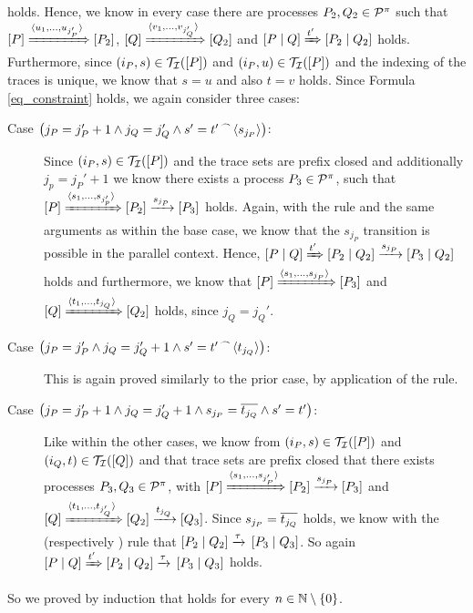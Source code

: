 \begin{prf}
\begin{description}
holds. Hence, we know in every case there are processes $P_2,Q_2\in\mathcal P^{\pi}$ such that $\left[P\right]\xRightarrow{\langle u_1,\ldots,u_{j_P'}\rangle}\left[P_2\right]$, $\left[Q\right]\xRightarrow{\langle v_1,\ldots,v_{j_Q'}\rangle}\left[Q_2\right]$ and $\left[P \mid Q\right]\xRightarrow{t'}\left[P_2 \mid Q_2\right]$ holds. Furthermore, since $\left(i_P,s\right)\in\mathcal{T_I}(\left[P\right])$ and $\left(i_P,u\right)\in\mathcal{T_I}(\left[P\right])$ and the indexing of the traces is unique, we know that $s=u$ and also $t=v$ holds. Since Formula \ref{eq_constraint} holds, we again consider three cases:
\begin{description}
		\item[Case $\left(j_P=j_P'+1\wedge j_Q=j_Q'\wedge s'={t'}^{\,\frown{}\,}{\langle s_{j_P}\rangle}\right)$:] Since $\left(i_P,s\right)\in\mathcal{T_I}(\left[P\right])$ and the trace sets are prefix closed and additionally $j_p=j_P'+1$ we know there exists a process $P_3\in\mathcal P^{\pi}$, such that $\left[P\right]\xRightarrow{\langle s_1,\ldots,s_{j_p'}\rangle}\left[P_2\right]\xrightarrow{s_{j_P}}\left[P_3\right]$ holds. Again, with the \eparl{} rule and the same arguments as within the base case, we know that the $s_{j_P}$ transition is possible in the parallel context. Hence, $\left[P \mid Q\right]\xRightarrow{t'}\left[P_2 \mid Q_2\right]\xrightarrow{s_{j_P}}\left[P_3 \mid Q_2\right]$ holds and furthermore, we know that $\left[P\right]\xRightarrow{\langle s_1,\ldots,s_{j_P}\rangle}\left[P_3\right]$ and $\left[Q\right]\xRightarrow{\langle t_1,\ldots,t_{j_Q}\rangle}\left[Q_2\right]$ holds, since $j_Q=j_Q'$.
		
		\item[Case $\left(j_P=j_P'\wedge j_Q=j_Q'+1\wedge s'={t'}^{\,\frown{}\,}{\langle t_{j_Q}\rangle}\right)$:] This is again proved similarly to the prior case, by application of the \eparr{} rule.

		\item[Case $\left(j_P=j_P'+1\wedge j_Q=j_Q'+1\wedge s_{j_P}=\overline{t_{j_Q}}\wedge s'=t'\right)$:] Like within the other cases, we know from $\left(i_P,s\right)\in\mathcal{T_I}(\left[P\right])$ and $\left(i_Q,t\right)\in\mathcal{T_I}(\left[Q\right])$ and that trace sets are prefix closed that there exists processes $P_3,Q_3\in\mathcal P^{\pi}$, with $\left[P\right]\xRightarrow{\langle s_1,\ldots,s_{j_P'}\rangle}\left[P_2\right]\xrightarrow{s_{j_P}}\left[P_3\right]$ and $\left[Q\right]\xRightarrow{\langle t_1,\ldots,t_{j_Q'}\rangle}\left[Q_2\right]\xrightarrow{t_{j_Q}}\left[Q_3\right]$. Since $s_{j_P}=\overline{t_{j_Q}}$ holds, we know with the \ecoml{} (respectively \ecomr{}) rule that $\left[P_2 \mid Q_2\right]\xrightarrow{\tau}{}\left[P_3 \mid Q_3\right]$. So again $\left[P \mid Q\right]\xRightarrow{t'}\left[P_2 \mid Q_2\right]\xrightarrow{\tau}{}\left[P_3 \mid Q_3\right]$ holds.
	\end{description}
\end{description}
So we proved by induction that  holds for every $n\in\N\setminus\set{0}$.
\end{prf}

